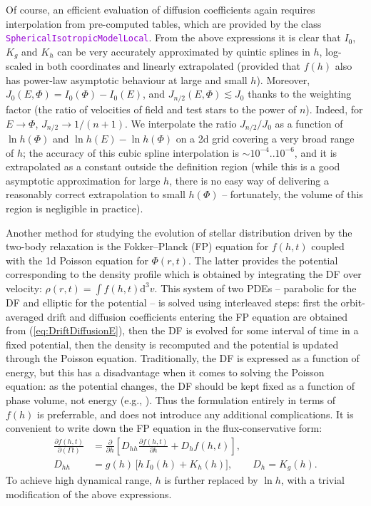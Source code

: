 \documentclass[12pt]{article}
\newcommand{\ttt}[1]{\textcolor{darkviolet}{\texttt{#1}}}
\renewcommand{\d}{\mathrm{d}}
\newcommand{\D}{\partial}
\begin{document}
Of course, an efficient evaluation of diffusion coefficients again requires interpolation from pre-computed tables, which are provided by the class \ttt{SphericalIsotropicModelLocal}. From the above expressions it is clear that $I_0$, $K_g$ and $K_h$ can be very accurately approximated by quintic splines in $h$, log-scaled in both coordinates and linearly extrapolated (provided that $f(h)$ also has power-law asymptotic behaviour at large and small $h$). 
Moreover, $J_0(E,\Phi) = I_0(\Phi)-I_0(E)$, and $J_{n/2}(E,\Phi)\lesssim J_0$ thanks to the weighting factor (the ratio of velocities of field and test stars to the power of $n$). Indeed, for $E\to\Phi$, $J_{n/2} \to 1/(n+1)$. We interpolate the ratio $J_{n/2}/J_0$ as a function of $\ln h(\Phi)$ and $\ln h(E)-\ln h(\Phi)$ on a 2d grid covering a very broad range of $h$; the accuracy of this cubic spline interpolation is $\sim 10^{-4}..10^{-6}$, and it is extrapolated as a constant outside the definition region (while this is a good asymptotic approximation for large $h$, there is no easy way of delivering a reasonably correct extrapolation to small $h(\Phi)$ -- fortunately, the volume of this region is negligible in practice).

Another method for studying the evolution of stellar distribution driven by the two-body relaxation is the Fokker--Planck (FP) equation for $f(h,t)$ coupled with the 1d Poisson equation for $\Phi(r,t)$. The latter provides the potential corresponding to the density profile which is obtained by integrating the DF over velocity: $\rho(r,t)=\int f(h,t) \d ^3v$. This system of two PDEs -- parabolic for the DF and elliptic for the potential -- is solved using interleaved steps: first the orbit-averaged drift and diffusion coefficients entering the FP equation are obtained from (\ref{eq:DriftDiffusionE}), then the DF is evolved for some interval of time in a fixed potential, then the density is recomputed and the potential is updated through the Poisson equation.
Traditionally, the DF is expressed as a function of energy, but this has a disadvantage when it comes to solving the Poisson equation: as the potential changes, the DF should be kept fixed as a function of phase volume, not energy (e.g., \cite{Cohn1980}). Thus the formulation entirely in terms of $f(h)$ is preferrable, and does not introduce any additional complications. It is convenient to write down the FP equation in the flux-conservative form:
\begin{align}
\frac{\D f(h,t)}{\D (\Gamma t)} &= \frac{\D }{\D h} \left[ D_{hh} \frac{\D f(h,t)}{\D h} + D_h f(h,t) \right] , \label{eq:FokkerPlanck} \\
D_{hh} &= g(h)\,\big[ h\, I_0(h) + K_h(h) \big], \qquad D_h = K_g(h).  \label{eq:FokkerPlanckCoefs}
\end{align}
To achieve high dynamical range, $h$ is further replaced by $\ln h$, with a trivial modification of the above expressions.
\end{document}
